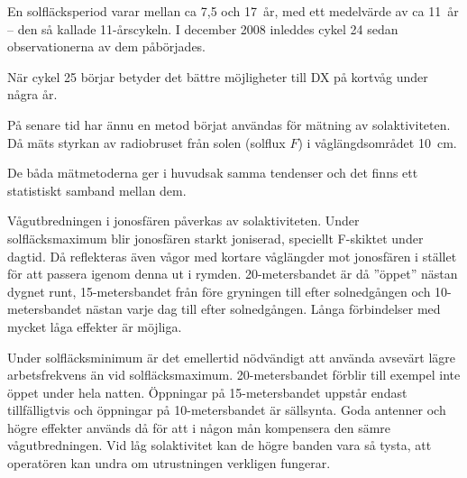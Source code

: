 En solfläcksperiod varar mellan ca 7,5 och 17~år, med ett medelvärde
av ca 11~år -- den så kallade 11-årscykeln.
I december 2008 inleddes cykel 24 sedan observationerna av dem påbörjades.

När cykel 25 börjar betyder det bättre möjligheter till DX på kortvåg under
några år.

På senare tid har ännu en metod börjat användas för mätning av solaktiviteten.
Då mäts styrkan av radiobruset från solen (solflux \(F\)) i våglängdsområdet
10~cm.

De båda mätmetoderna ger i huvudsak samma tendenser och det finns ett
statistiskt samband mellan dem.

Vågutbredningen i jonosfären påverkas av solaktiviteten.
Under solfläcksmaximum blir jonosfären starkt joniserad, speciellt F-skiktet
under dagtid.
Då reflekteras även vågor med kortare våglängder mot jonosfären i stället för
att passera igenom denna ut i rymden.
20-metersbandet är då ''öppet'' nästan dygnet runt, 15-metersbandet från före
gryningen till efter solnedgången och 10-metersbandet nästan varje dag till
efter solnedgången.
Långa förbindelser med mycket låga effekter är möjliga.

Under solfläcksminimum är det emellertid nödvändigt att använda avsevärt lägre
arbetsfrekvens än vid solfläcksmaximum.
20-metersbandet förblir till exempel inte öppet under hela natten.
Öppningar på 15-metersbandet uppstår endast tillfälligtvis och öppningar på
10-metersbandet är sällsynta.
Goda antenner och högre effekter används då för att i någon mån kompensera den
sämre vågutbredningen.
Vid låg solaktivitet kan de högre banden vara så tysta, att operatören kan
undra om utrustningen verkligen fungerar.
